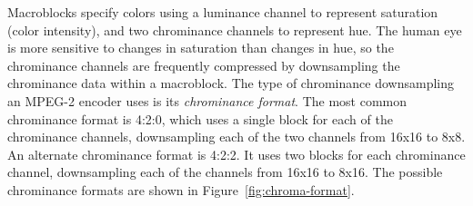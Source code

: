 
Macroblocks specify colors using a luminance channel to represent
saturation (color intensity), and two chrominance channels to
represent hue. The human eye is more sensitive to changes in
saturation than changes in hue, so the chrominance channels are
frequently compressed by downsampling the chrominance data within a
macroblock. The type of chrominance downsampling an MPEG-2 encoder
uses is its {\it chrominance format}. The most common chrominance
format is 4:2:0, which uses a single block for each of the chrominance
channels, downsampling each of the two channels from 16x16 to 8x8.  An
alternate chrominance format is 4:2:2. It uses two blocks for each
chrominance channel, downsampling each of the channels from 16x16 to
8x16. The possible chrominance formats are shown in
Figure~\ref{fig:chroma-format}.

